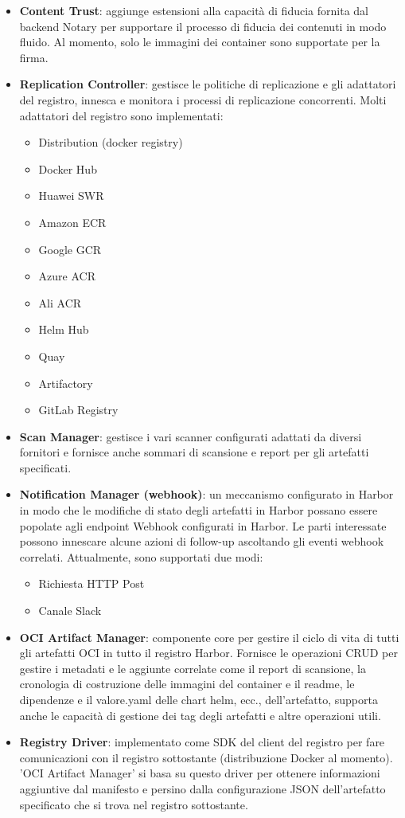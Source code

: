 \documentclass[12pt,a4paper]{report}
\begin{document}
\begin{itemize}
  \item \textbf{Content Trust}: aggiunge estensioni alla capacità di fiducia fornita dal backend Notary per supportare il processo di fiducia dei contenuti in modo fluido. Al momento, solo le immagini dei container sono supportate per la firma.
  \item \textbf{Replication Controller}: gestisce le politiche di replicazione e gli adattatori del registro, innesca e monitora i processi di replicazione concorrenti. Molti adattatori del registro sono implementati:
  \begin{itemize}
    \item Distribution (docker registry)
    \item Docker Hub
    \item Huawei SWR
    \item Amazon ECR
    \item Google GCR
    \item Azure ACR
    \item Ali ACR
    \item Helm Hub
    \item Quay
    \item Artifactory
    \item GitLab Registry
  \end{itemize}
  \item \textbf{Scan Manager}: gestisce i vari scanner configurati adattati da diversi fornitori e fornisce anche sommari di scansione e report per gli artefatti specificati.
  \item \textbf{Notification Manager (webhook)}: un meccanismo configurato in Harbor in modo che le modifiche di stato degli artefatti in Harbor possano essere popolate agli endpoint Webhook configurati in Harbor. Le parti interessate possono innescare alcune azioni di follow-up ascoltando gli eventi webhook correlati. Attualmente, sono supportati due modi:
  \begin{itemize}
    \item Richiesta HTTP Post
    \item Canale Slack
  \end{itemize}
  \item \textbf{OCI Artifact Manager}: componente core per gestire il ciclo di vita di tutti gli artefatti OCI in tutto il registro Harbor. Fornisce le operazioni CRUD per gestire i metadati e le aggiunte correlate come il report di scansione, la cronologia di costruzione delle immagini del container e il readme, le dipendenze e il valore.yaml delle chart helm, ecc., dell'artefatto, supporta anche le capacità di gestione dei tag degli artefatti e altre operazioni utili.
  \item \textbf{Registry Driver}: implementato come SDK del client del registro per fare comunicazioni con il registro sottostante (distribuzione Docker al momento). 'OCI Artifact Manager' si basa su questo driver per ottenere informazioni aggiuntive dal manifesto e persino dalla configurazione JSON dell'artefatto specificato che si trova nel registro sottostante.
\end{itemize}
\end{document}
